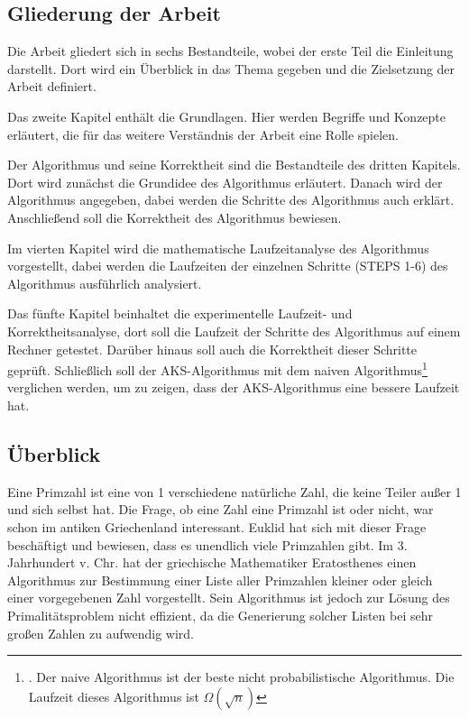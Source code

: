 \documentclass[12pt,oneside]{article}
\theoremstyle{remark}
\theoremstyle{definition}
\begin{document}
\subsection{Gliederung der Arbeit}
Die Arbeit gliedert sich in sechs Bestandteile, wobei der
erste Teil die Einleitung darstellt. Dort wird ein Überblick in das Thema gegeben und die Zielsetzung der Arbeit definiert.

Das zweite Kapitel enthält die Grundlagen. Hier werden Begriffe und Konzepte erläutert, die für das weitere Verständnis der Arbeit eine Rolle spielen. 

Der Algorithmus und seine Korrektheit sind die Bestandteile des dritten Kapitels. Dort wird zunächst die Grundidee des Algorithmus erläutert. Danach wird der Algorithmus angegeben, dabei werden die Schritte des Algorithmus auch erklärt. Anschließend soll die Korrektheit des Algorithmus bewiesen. 

Im vierten Kapitel wird die mathematische Laufzeitanalyse des Algorithmus vorgestellt, dabei werden die Laufzeiten der einzelnen Schritte (STEPS 1-6) des Algorithmus ausführlich analysiert.

Das fünfte Kapitel beinhaltet die experimentelle Laufzeit- und Korrektheitsanalyse, dort  soll die Laufzeit der Schritte des Algorithmus auf einem Rechner getestet. Darüber hinaus soll auch die Korrektheit dieser Schritte geprüft. Schließlich soll der AKS-Algorithmus mit dem naiven Algorithmus\footnote{. Der naive Algorithmus ist der beste nicht probabilistische Algorithmus. Die Laufzeit dieses Algorithmus ist $\Omega(\sqrt{n})$} verglichen werden, um zu zeigen, dass der AKS-Algorithmus eine bessere Laufzeit hat.  

\subsection{Überblick}
Eine Primzahl ist eine von 1 verschiedene natürliche Zahl, die keine Teiler außer 1 und sich selbst hat. Die Frage, ob eine Zahl eine Primzahl ist oder nicht, war schon im antiken Griechenland interessant. Euklid hat sich mit dieser Frage beschäftigt und bewiesen, dass es unendlich viele Primzahlen gibt. Im 3. Jahrhundert v. Chr. hat der griechische Mathematiker Eratosthenes einen Algorithmus zur Bestimmung einer Liste aller Primzahlen kleiner oder gleich einer vorgegebenen Zahl vorgestellt. Sein Algorithmus ist jedoch zur Lösung des Primalitätsproblem nicht effizient, da die Generierung solcher Listen bei sehr großen Zahlen zu aufwendig wird.
\end{document}
